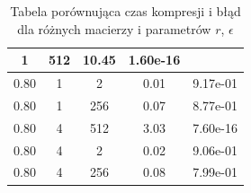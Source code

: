 \documentclass{../myclass}
\begin{document}
\begin{table}[ht]
\begin{tabular}{ccccc}
    \multicolumn{1}{c|}{1}     & \multicolumn{1}{c|}{512}
    & \multicolumn{1}{c|}{10.45}        & \multicolumn{1}{c|}{1.60e-16}
    \\ \hline
    \multicolumn{1}{|c|}{0.80}                                                              &
    \multicolumn{1}{c|}{1}     & \multicolumn{1}{c|}{2}
    & \multicolumn{1}{c|}{0.01}         & \multicolumn{1}{c|}{9.17e-01}
    \\ \hline
    \multicolumn{1}{|c|}{0.80}                                                              &
    \multicolumn{1}{c|}{1}     & \multicolumn{1}{c|}{256}
    & \multicolumn{1}{c|}{0.07}         & \multicolumn{1}{c|}{8.77e-01}
    \\ \hline
    \multicolumn{1}{|c|}{0.80}                                                              &
    \multicolumn{1}{c|}{4}     & \multicolumn{1}{c|}{512}
    & \multicolumn{1}{c|}{3.03}         & \multicolumn{1}{c|}{7.60e-16}
    \\ \hline
    \multicolumn{1}{|c|}{0.80}                                                              &
    \multicolumn{1}{c|}{4}     & \multicolumn{1}{c|}{2}
    & \multicolumn{1}{c|}{0.02}         & \multicolumn{1}{c|}{9.06e-01}
    \\ \hline
    \multicolumn{1}{|c|}{0.80}                                                              &
    \multicolumn{1}{c|}{4}     & \multicolumn{1}{c|}{256}
    & \multicolumn{1}{c|}{0.08}         & \multicolumn{1}{c|}{7.99e-01}
    \\ \hline
    \end{tabular}
    \caption{Tabela porównująca czas kompresji i błąd dla różnych macierzy i parametrów \(r\), \(\epsilon\)}
    \label{Tab:1}
    \end{table}
\end{document}
